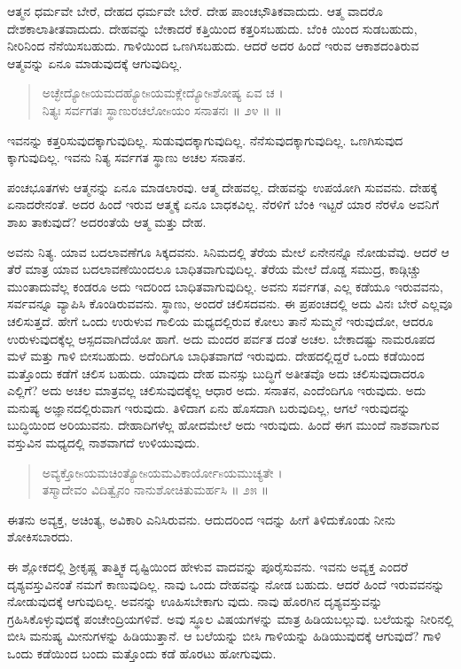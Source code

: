 ಆತ್ಮನ ಧರ್ಮವೇ ಬೇರೆ, ದೇಹದ ಧರ್ಮವೇ ಬೇರೆ. ದೇಹ ಪಾಂಚಭೌತಿಕವಾದುದು. ಆತ್ಮ ವಾದರೊ ದೇಶಕಾಲಾತೀತವಾದುದು. ದೇಹವನ್ನು ಬೇಕಾದರೆ ಕತ್ತಿಯಿಂದ ಕತ್ತರಿಸಬಹುದು. ಬೆಂಕಿ ಯಿಂದ ಸುಡಬಹುದು, ನೀರಿನಿಂದ ನೆನೆಯಿಸಬಹುದು. ಗಾಳಿಯಿಂದ ಒಣಗಿಸಬಹುದು. ಆದರೆ ಅದರ ಹಿಂದೆ ಇರುವ ಆಕಾಶದಂತಿರುವ ಆತ್ಮವನ್ನು ಏನೂ ಮಾಡುವುದಕ್ಕೆ ಆಗುವುದಿಲ್ಲ.

\begin{verse}
ಅಚ್ಛೇದ್ಯೋsಯಮದಹ್ಯೋsಯಮಕ್ಲೇದ್ಯೋsಶೋಷ್ಯ ಏವ ಚ ।\\ನಿತ್ಯಃ ಸರ್ವಗತಃ ಸ್ಥಾಣುರಚಲೋsಯಂ ಸನಾತನಃ \num{॥ ೨೪ ॥ ॥}
\end{verse}

{\small ಇವನನ್ನು ಕತ್ತರಿಸುವುದಕ್ಕಾಗುವುದಿಲ್ಲ. ಸುಡುವುದಕ್ಕಾಗುವುದಿಲ್ಲ. ನೆನೆಸುವುದಕ್ಕಾಗುವುದಿಲ್ಲ. ಒಣಗಿಸುವುದ ಕ್ಕಾಗುವುದಿಲ್ಲ. ಇವನು ನಿತ್ಯ ಸರ್ವಗತ ಸ್ಥಾಣು ಅಚಲ ಸನಾತನ.}

ಪಂಚಭೂತಗಳು ಆತ್ಮನನ್ನು ಏನೂ ಮಾಡಲಾರವು. ಆತ್ಮ ದೇಹವಲ್ಲ. ದೇಹವನ್ನು ಉಪಯೋಗಿ ಸುವವನು. ದೇಹಕ್ಕೆ ಏನಾದರೇನಂತೆ. ಅದರ ಹಿಂದೆ ಇರುವ ಆತ್ಮಕ್ಕೆ ಏನೂ ಬಾಧಕವಿಲ್ಲ. ನೆರಳಿಗೆ ಬೆಂಕಿ ಇಟ್ಟರೆ ಯಾರ ನೆರಳೊ ಅವನಿಗೆ ಶಾಖ ತಾಕುವುದೆ? ಅದರಂತೆಯೆ ಆತ್ಮ ಮತ್ತು ದೇಹ.

ಅವನು ನಿತ್ಯ. ಯಾವ ಬದಲಾವಣೆಗೂ ಸಿಕ್ಕದವನು. ಸಿನಿಮದಲ್ಲಿ ತೆರೆಯ ಮೇಲೆ ಏನೇನನ್ನೊ ನೋಡುವೆವು. ಆದರೆ ಆ ತೆರೆ ಮಾತ್ರ ಯಾವ ಬದಲಾವಣೆಯಿಂದಲೂ ಬಾಧಿತವಾಗುವುದಿಲ್ಲ. ತೆರೆಯ ಮೇಲೆ ದೊಡ್ಡ ಸಮುದ್ರ, ಕಾಡ್ಗಿಚ್ಚು ಮುಂತಾದುವೆಲ್ಲ ಕಂಡರೂ ಅದು ಇದರಿಂದ ಬಾಧಿತವಾಗುವುದಿಲ್ಲ. ಅವನು ಸರ್ವಗತ, ಎಲ್ಲ ಕಡೆಯೂ ಇರುವವನು, ಸರ್ವವನ್ನೂ ವ್ಯಾಪಿಸಿ ಕೊಂಡಿರುವವನು. ಸ್ಥಾಣು, ಅಂದರೆ ಚಲಿಸದವನು. ಈ ಪ್ರಪಂಚದಲ್ಲಿ ಅದು ವಿನಃ ಬೇರೆ ಎಲ್ಲವೂ ಚಲಿಸುತ್ತದೆ. ಹೇಗೆ ಒಂದು ಉರುಳುವ ಗಾಲಿಯ ಮಧ್ಯದಲ್ಲಿರುವ ಕೋಲು ತಾನೆ ಸುಮ್ಮನೆ ಇರುವುದೋ, ಆದರೂ ಉರುಳುವುದಕ್ಕೆಲ್ಲ ಆಸ್ಪದವಾಗಿದೆಯೋ ಹಾಗೆ. ಅದು ಮಂದರ ಪರ್ವತ ದಂತೆ ಅಚಲ. ಬೇಕಾದಷ್ಟು ನಾಮರೂಪದ ಮಳೆ ಮತ್ತು ಗಾಳಿ ಬೀಸಬಹುದು. ಅದೆಂದಿಗೂ ಬಾಧಿತವಾಗದೆ ಇರುವುದು. ದೇಹದಲ್ಲಿದ್ದರೆ ಒಂದು ಕಡೆಯಿಂದ ಮತ್ತೊಂದು ಕಡೆಗೆ ಚಲಿಸ ಬಹುದು. ಯಾವುದು ದೇಹ ಮನಸ್ಸು ಬುದ್ಧಿಗೆ ಅತೀತವೊ ಅದು ಚಲಿಸುವುದಾದರೂ ಎಲ್ಲಿಗೆ? ಅದು ಅಚಲ ಮಾತ್ರವಲ್ಲ ಚಲಿಸುವುದಕ್ಕೆಲ್ಲ ಆಧಾರ ಅದು. ಸನಾತನ, ಎಂದೆಂದಿಗೂ ಇರುವುದು. ಅದು ಮನುಷ್ಯ ಅಜ್ಞಾನದಲ್ಲಿರುವಾಗ ಇರುವುದು. ತಿಳಿದಾಗ ಏನು ಹೊಸದಾಗಿ ಬರುವುದಿಲ್ಲ, ಆಗಲೆ ಇರುವುದನ್ನು ಬುದ್ಧಿಯಿಂದ ಅರಿಯುವನು. ದೇಹಾದಿಗಳೆಲ್ಲ ಹೋದಮೇಲೆ ಅದು ಇರುವುದು. ಹಿಂದೆ ಈಗ ಮುಂದೆ ನಾಶವಾಗುವ ವಸ್ತುವಿನ ಮಧ್ಯದಲ್ಲಿ ನಾಶವಾಗದೆ ಉಳಿಯುವುದು.

\begin{verse}
ಅವ್ಯಕ್ತೋsಯಮಚಿಂತ್ಯೋsಯಮವಿಕಾರ್ಯೋsಯಮುಚ್ಯತೇ ।\\ತಸ್ಮಾದೇವಂ ವಿದಿತ್ವೈನಂ ನಾನುಶೋಚಿತುಮರ್ಹಸಿ \num{॥ ೨೫ ॥}
\end{verse}

{\small ಈತನು ಅವ್ಯಕ್ತ, ಅಚಿಂತ್ಯ, ಅವಿಕಾರಿ ಎನಿಸಿರುವನು. ಆದುದರಿಂದ ಇದನ್ನು ಹೀಗೆ ತಿಳಿದುಕೊಂಡು ನೀನು ಶೋಕಿಸಬಾರದು.}

ಈ ಶ್ಲೋಕದಲ್ಲಿ ಶ್ರೀಕೃಷ್ಣ ತಾತ್ತ್ವಿಕ ದೃಷ್ಟಿಯಿಂದ ಹೇಳುವ ವಾದವನ್ನು ಪೂರೈಸುವನು. ಇವನು ಅವ್ಯಕ್ತ ಎಂದರೆ ದೃಶ್ಯವಸ್ತುವಿನಂತೆ ನಮಗೆ ಕಾಣುವುದಿಲ್ಲ. ನಾವು ಒಂದು ದೇಹವನ್ನು ನೋಡ ಬಹುದು. ಆದರೆ ಹಿಂದೆ ಇರುವವನನ್ನು ನೋಡುವುದಕ್ಕೆ ಆಗುವುದಿಲ್ಲ. ಅವನನ್ನು ಊಹಿಸಬೇಕಾಗು ವುದು. ನಾವು ಹೊರಗಿನ ದೃಶ್ಯವಸ್ತುವನ್ನು ಗ್ರಹಿಸಿಕೊಳ್ಳುವುದಕ್ಕೆ ಪಂಚೇಂದ್ರಿಯಗಳಿವೆ. ಅವು ಸ್ಥೂಲ ವಿಷಯಗಳನ್ನು ಮಾತ್ರ ಹಿಡಿಯಬಲ್ಲುವು. ಬಲೆಯನ್ನು ನೀರಿನಲ್ಲಿ ಬೀಸಿ ಮನುಷ್ಯ ಮೀನುಗಳನ್ನು ಹಿಡಿಯುತ್ತಾನೆ. ಆ ಬಲೆಯನ್ನು ಬೀಸಿ ಗಾಳಿಯನ್ನು ಹಿಡಿಯುವುದಕ್ಕೆ ಆಗುವುದೆ? ಗಾಳಿ ಒಂದು ಕಡೆಯಿಂದ ಬಂದು ಮತ್ತೊಂದು ಕಡೆ ಹೊರಟು ಹೋಗುವುದು.


